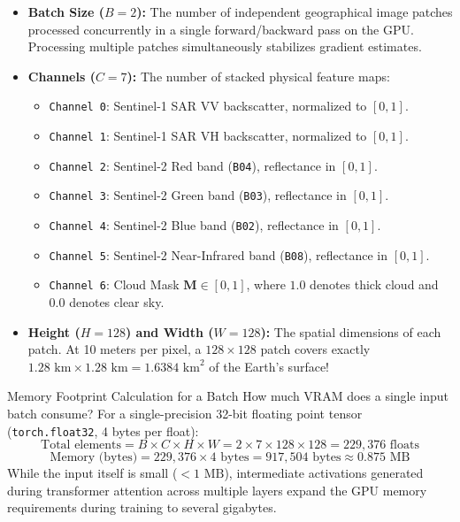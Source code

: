 \begin{itemize}
    \item \textbf{Batch Size ($B = 2$):} The number of independent geographical image patches processed concurrently in a single forward/backward pass on the GPU. Processing multiple patches simultaneously stabilizes gradient estimates.
    \item \textbf{Channels ($C = 7$):} The number of stacked physical feature maps:
    \begin{itemize}
        \item \texttt{Channel 0}: Sentinel-1 SAR VV backscatter, normalized to $[0, 1]$.
        \item \texttt{Channel 1}: Sentinel-1 SAR VH backscatter, normalized to $[0, 1]$.
        \item \texttt{Channel 2}: Sentinel-2 Red band (\texttt{B04}), reflectance in $[0, 1]$.
        \item \texttt{Channel 3}: Sentinel-2 Green band (\texttt{B03}), reflectance in $[0, 1]$.
        \item \texttt{Channel 4}: Sentinel-2 Blue band (\texttt{B02}), reflectance in $[0, 1]$.
        \item \texttt{Channel 5}: Sentinel-2 Near-Infrared band (\texttt{B08}), reflectance in $[0, 1]$.
        \item \texttt{Channel 6}: Cloud Mask $\mathbf{M} \in [0, 1]$, where $1.0$ denotes thick cloud and $0.0$ denotes clear sky.
    \end{itemize}
    \item \textbf{Height ($H = 128$) and Width ($W = 128$):} The spatial dimensions of each patch. At 10 meters per pixel, a $128 \times 128$ patch covers exactly $1.28\text{ km} \times 1.28\text{ km} = 1.6384\text{ km}^2$ of the Earth's surface!
\end{itemize}

\begin{mathbox}{Memory Footprint Calculation for a Batch}
How much VRAM does a single input batch consume?
For a single-precision 32-bit floating point tensor (\texttt{torch.float32}, 4 bytes per float):
\[
\text{Total elements} = B \times C \times H \times W = 2 \times 7 \times 128 \times 128 = 229{,}376\text{ floats}
\]
\[
\text{Memory (bytes)} = 229{,}376 \times 4\text{ bytes} = 917{,}504\text{ bytes} \approx 0.875\text{ MB}
\]
While the input itself is small ($<1\text{ MB}$), intermediate activations generated during transformer attention across multiple layers expand the GPU memory requirements during training to several gigabytes.
\end{mathbox}

